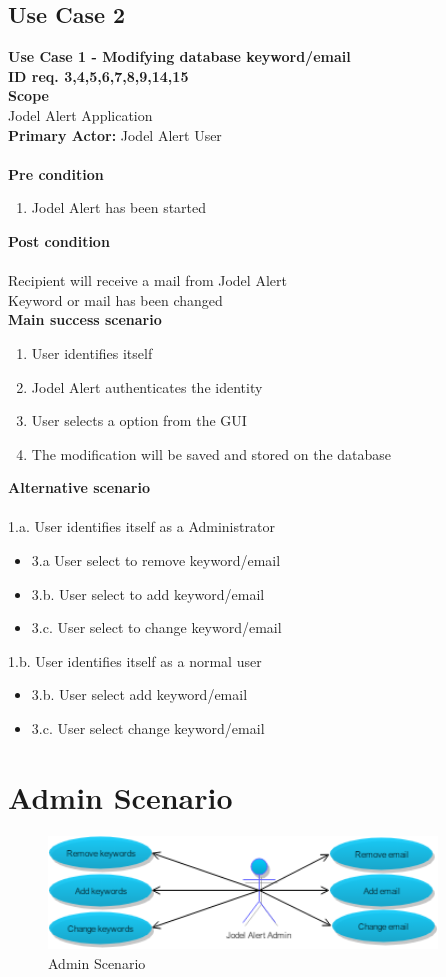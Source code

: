 \documentclass[a4paper,12pt]{article}
\begin{document}
\subsection{Use Case 2}
\textbf{Use Case 1 - Modifying database keyword/email}\\
\textbf{ID req. 3,4,5,6,7,8,9,14,15}\\
\textbf{Scope}\\
Jodel Alert Application\\
\textbf{Primary Actor:}
Jodel Alert User\\\\
\textbf{Pre condition}
\begin{enumerate}
	\item Jodel Alert has been started
\end{enumerate}
\textbf{Post condition}\\\\
Recipient will receive a mail from Jodel Alert\\
Keyword or mail has been changed\\
\textbf{Main success scenario}
\begin{enumerate}
	\item User identifies itself
	\item Jodel Alert authenticates the identity 
	\item User selects a option from the GUI
	\item The modification will be saved and stored on the database 
	
\end{enumerate}
\textbf{Alternative scenario}\\\\
1.a. User identifies itself as a Administrator
\begin{itemize}
	\item 3.a User select to remove keyword/email
	\item 3.b. User select to add keyword/email
	\item 3.c. User select to change keyword/email
\end{itemize}
1.b. User identifies itself as a normal user
\begin{itemize}
	\item 3.b. User select add keyword/email
	\item 3.c. User select change keyword/email
\end{itemize}


\clearpage
\section{Admin Scenario}
\begin{figure}[!h]
	\centering
	\includegraphics[height=3cm]{img/scenarioadmin.png}
	\caption{Admin Scenario}
	\label{Participating objects}
\end{figure}
\end{document}
